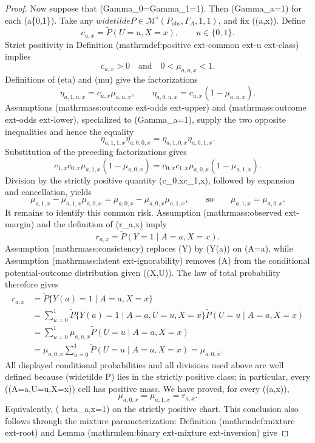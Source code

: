 \documentclass{article}
\begin{document}
\begin{proof}
Now suppose that (Gamma\_0=Gamma\_1=1).  Then (Gamma\_a=1) for each (a\in\{0,1\}).  Take any
\(widetilde P\in\mathcal M^{\circ}(P_{\mathrm{obs}},\Gamma_A,1,1)\), and fix ((a,x)).  Define
\[
c_{u,x}=\widetilde P(U=u,X=x),
\qquad u\in\{0,1\}.
\]
Strict positivity in Definition (mathrm{def{:}positive  ext{-}common  ext{-}u  ext{-}class}) implies
\[
c_{u,x}>0
\quad\text{and}\quad
0<\mu_{a,u,x}<1.
\]
Definitions of (eta) and (mu) give the factorizations
\[
\eta_{a,1,u,x}=c_{u,x}\mu_{a,u,x},
\qquad
\eta_{a,0,u,x}=c_{u,x}(1-\mu_{a,u,x}).
\]
Assumptions (mathrm{ass{:}outcome  ext{-}odds  ext{-}upper}) and (mathrm{ass{:}outcome  ext{-}odds  ext{-}lower}), specialized to (Gamma\_a=1), supply the two opposite inequalities and hence the equality
\[
\eta_{a,1,1,x}\eta_{a,0,0,x}
=\eta_{a,1,0,x}\eta_{a,0,1,x}.
\]
Substitution of the preceding factorizations gives
\[
c_{1,x}c_{0,x}\mu_{a,1,x}(1-\mu_{a,0,x})
=c_{0,x}c_{1,x}\mu_{a,0,x}(1-\mu_{a,1,x}).
\]
Division by the strictly positive quantity (c\_{0,x}c\_{1,x}), followed by expansion and cancellation, yields
\[
\mu_{a,1,x}-\mu_{a,1,x}\mu_{a,0,x}
=\mu_{a,0,x}-\mu_{a,0,x}\mu_{a,1,x},
\qquad\text{so}\qquad
\mu_{a,1,x}=\mu_{a,0,x}.
\]
It remains to identify this common risk.  Assumption (mathrm{ass{:}observed  ext{-}margin}) and the definition of (r\_{a,x}) imply
\[
r_{a,x}=\widetilde P(Y=1\mid A=a,X=x).
\]
Assumption (mathrm{ass{:}consistency}) replaces (Y) by (Y(a)) on ({A=a}), while Assumption (mathrm{ass{:}latent  ext{-}ignorability}) removes (A) from the conditional potential-outcome distribution given ((X,U)).  The law of total probability therefore gives
\[
\begin{aligned}
r_{a,x}
&=\widetilde P\{Y(a)=1\mid A=a,X=x\}\\
&=\sum_{u=0}^1
  \widetilde P\{Y(a)=1\mid A=a,U=u,X=x\}
  \widetilde P(U=u\mid A=a,X=x)\\
&=\sum_{u=0}^1
  \mu_{a,u,x}\widetilde P(U=u\mid A=a,X=x)\\
&=\mu_{a,0,x}\sum_{u=0}^1
  \widetilde P(U=u\mid A=a,X=x)
=\mu_{a,0,x}.
\end{aligned}
\]
All displayed conditional probabilities and all divisions used above are well defined because (widetilde P) lies in the strictly positive class; in particular, every ((A=a,U=u,X=x)) cell has positive mass.  We have proved, for every ((a,x)),
\[
\mu_{a,0,x}=\mu_{a,1,x}=r_{a,x}.
\]
Equivalently, (  heta\_{a,x}=1) on the strictly positive chart.  This conclusion also follows through the mixture parameterization: Definition (mathrm{def{:}mixture  ext{-}root}) and Lemma (mathrm{lem{:}binary  ext{-}mixture  ext{-}inversion}) give

\end{proof}
\end{document}
